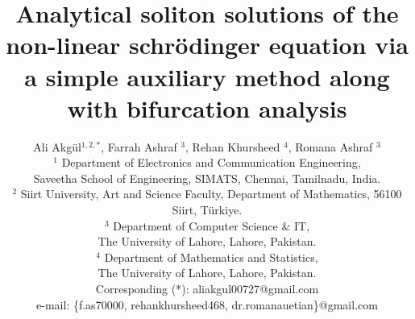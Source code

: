 \documentclass{article}
\date{}
\numberwithin{equation}{section}
\begin{document}
\title{ \textbf{Analytical soliton solutions of the non-linear schr\"{o}dinger equation via a simple auxiliary method along with bifurcation analysis } }
\author{ Ali Akg\"{u}l$^{1,2,*}$, Farrah Ashraf $^{3}$, Rehan Khursheed $^{4}$, Romana Ashraf $^{3}$ \\
$^{1}$ Department of Electronics and Communication Engineering,\\ Saveetha School of Engineering,
SIMATS, Chennai, Tamilnadu, India.\\
$^{2}$ Siirt University, Art and Science Faculty, Department of Mathematics, 56100 Siirt, Türkiye.\\
$^{3}$ Department of Computer Science $ \& $ IT,\\ The University of Lahore, Lahore, Pakistan.\\
$^{4}$ Department of Mathematics and Statistics,\\ The University of Lahore, Lahore, Pakistan.\\
Corresponding (*): aliakgul00727@gmail.com\\
e-mail: \{f.as70000, rehankhursheed468, dr.romanauetian\}@gmail.com }
\date{ }
\maketitle
\end{document}

